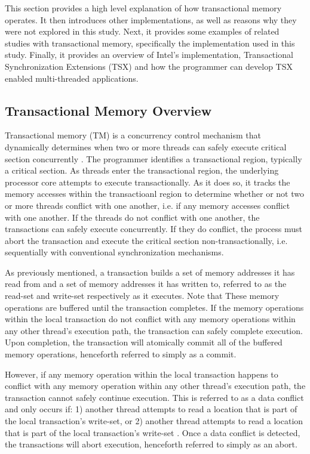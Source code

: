 \documentclass[a4paper]{article}
\begin{document}
\indent 
This section provides a high level explanation of how transactional
memory operates.  It then introduces other implementations, as well as reasons
why they were not explored in this study.  Next, it provides some examples of
related studies with transactional memory, specifically the implementation used
in this study. Finally, it provides an overview of Intel's implementation,
Transactional Synchronization Extensions (TSX) and how the programmer can
develop TSX enabled multi-threaded applications.
\par

\subsection{\textbf{Transactional Memory Overview}}

\indent
Transactional memory (TM) is a concurrency control mechanism that dynamically
determines when two or more threads can safely execute critical section
concurrently \cite{sle_rajwar}.  The programmer identifies a transactional
region, typically a critical section.  As threads enter the transactional region,
the underlying processor core attempts to execute transactionally. As it does
so, it tracks the memory accesses within the transactioanl region to determine
whether or not two or more threads conflict with one another, i.e. if any memory
accesses conflict with one another.  If the threads do not conflict with one
another, the transactions can safely execute concurrently.  If they do conflict,
the process must abort the transaction and execute the critical section
non-transactionally, i.e.  sequentially with conventional synchronization
mechanisms. 
\par

\indent 
As previously mentioned, a transaction builds a set of memory addresses it has
read from and a set of memory addresses it has written to, referred to as the
read-set and write-set respectively \cite{intel_prog_ref} as it executes.  Note
that These memory operations are buffered until the transaction completes.  If
the  memory operations within the local transaction do not conflict with any
memory operations within any other thread's execution path, the transaction can
safely complete execution.  Upon completion, the transaction will atomically
commit all of the buffered memory operations, henceforth referred to simply as a
commit.
\par

\indent 
However, if any memory operation within the local transaction happens to  
conflict with any memory operation within any other thread's execution path, the
transaction cannot safely continue execution.  This is referred to as a data
conflict and only occurs if: 1) another thread attempts to read a location that
is part of the local transaction's write-set, or 2) another thread attempts to
read a location that is part of the local transaction's write-set
\cite{intel_prog_ref}.  Once a data conflict is detected, the transactions will
abort execution, henceforth referred to simply as an abort.
\par
\end{document}
